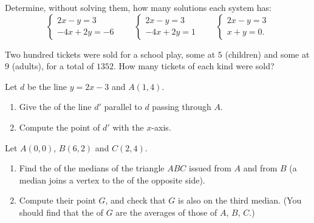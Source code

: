 \begin{exercise}[$\star\star$]\label{exo:g10:lines:7}
Determine, without solving them, how many solutions each system has:
\[
\begin{cases}
2x - y = 3 \\
-4x + 2y = -6
\end{cases}
\qquad
\begin{cases}
2x - y = 3 \\
-4x + 2y = 1
\end{cases}
\qquad
\begin{cases}
2x - y = 3 \\
x + y = 0 .
\end{cases}
\]
\end{exercise}

\begin{exercise}[$\star\star$]\label{exo:g10:lines:8}
Two hundred tickets were sold for a school play, some at $5$ (children)
and some at $9$ (adults), for a total of $1352$. How many tickets of each
kind were sold?
\end{exercise}

\begin{exercise}[$\star\star$]\label{exo:g10:lines:9}
Let $d$ be the line $y = 2x - 3$ and $A(1, 4)$.
\begin{enumerate}
  \item Give the  of the line $d'$ parallel to $d$ passing
        through $A$.
  \item Compute the  point of $d'$ with the $x$-axis.
\end{enumerate}
\end{exercise}

\begin{exercise}[$\star\star\star$]\label{exo:g10:lines:10}
Let $A(0, 0)$, $B(6, 2)$ and $C(2, 4)$.
\begin{enumerate}
  \item Find the  of the medians of the triangle $ABC$ issued
        from $A$ and from $B$ (a median joins a vertex to the  of
        the opposite side).
  \item Compute their  point $G$, and check that
        $G$ is also on the third median. (You should find that the
         of $G$ are the averages of those of $A$, $B$, $C$.)
\end{enumerate}
\end{exercise}


